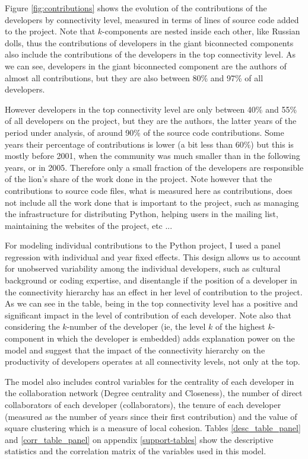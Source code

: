 Figure \ref{fig:contributions} shows the evolution of the contributions of the developers by connectivity level, measured in terms of lines of source code added to the project. Note that $k$-components are nested inside each other, like Russian dolls, thus the contributions of developers in the giant biconnected components also include the contributions of the developers in the top connectivity level. As we can see, developers in the giant biconnected component are the authors of almost all contributions, but they are also between 80\% and 97\% of all developers.

However developers in the top connectivity level are only between 40\% and 55\% of all developers on the project, but they are the authors, the latter years of the period under analysis, of around 90\% of the source code contributions. Some years their percentage of contributions is lower (a bit less than 60\%) but this is mostly before 2001, when the community was much smaller than in the following years, or in 2005. Therefore only a small fraction of the developers are responsible of the lion's share of the work done in the project. Note however that the contributions to source code files, what is measured here as contributions, does not include all the work done that is important to the project, such as managing the infrastructure for distributing Python, helping users in the mailing list, maintaining the websites of the project, etc ... 

For modeling individual contributions to the Python project, I used a panel regression with individual and year fixed effects. This design allows us to account for unobserved variability among the individual developers, such as cultural background or coding expertise, and disentangle if the position of a developer in the connectivity hierarchy has an effect in her level of contribution to the project. As we can see in the table, being in the top connectivity level has a positive and significant impact in the level of contribution of each developer. Note also that considering the $k$-number of the developer (ie, the level $k$ of the highest $k$-component in which the developer is embedded) adds explanation power on the model and suggest that the impact of the connectivity hierarchy on the productivity of developers operates at all connectivity levels, not only at the top.

The model also includes control variables for the centrality of each developer in the collaboration network (Degree centrality and Closeness), the number of direct collaborators of each developer (collaborators), the tenure of each developer (measured as the number of years since their first contribution) and the value of square clustering which is a measure of local cohesion. Tables \ref{desc_table_panel} and \ref{corr_table_panel} on appendix \ref{support-tables} show the descriptive statistics and the correlation matrix of the variables used in this model.

